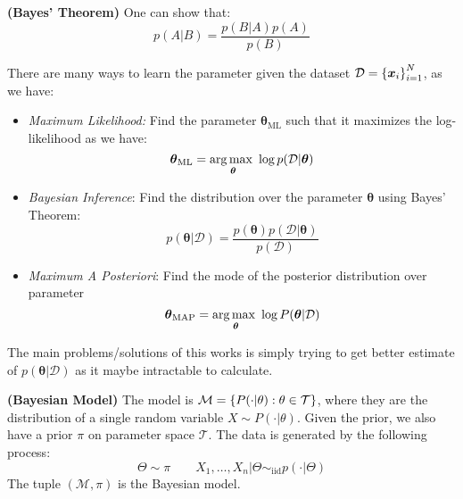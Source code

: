 \begin{theorem}{\textbf{(Bayes' Theorem)}}
    One can show that:
    \begin{equation*}
        p(A|B) = \frac{p(B|A)p(A)}{p(B)}
    \end{equation*}
\end{theorem}

\begin{remark}
    There are many ways to learn the parameter given the dataset $\mathcal{D} = \left\{ \boldsymbol x_i \right\}^N_{i=1}$, as we have:
    \begin{itemize}
        \item \emph{Maximum Likelihood:} Find the parameter $\boldsymbol \theta_\text{ML}$ such that it maximizes the log-likelihood as we have:
        \begin{equation*}
            \boldsymbol \theta_\text{ML} = \underset{\boldsymbol \theta}{\arg\max \ } \log p(\mathcal{D} | \boldsymbol \theta)
        \end{equation*}
        \item \emph{Bayesian Inference}: Find the distribution over the parameter $\boldsymbol \theta$ using Bayes' Theorem:
        \begin{equation*}
            p(\boldsymbol \theta | \mathcal{D}) = \frac{p(\boldsymbol \theta)p(\mathcal{D}|\boldsymbol \theta)}{p(\mathcal{D})}
        \end{equation*}
        \item \emph{Maximum A Posteriori}: Find the mode of the posterior distribution over parameter
        \begin{equation*}
            \boldsymbol \theta_\text{MAP} = \underset{\boldsymbol \theta}{\arg\max \ } \log P(\boldsymbol \theta | \mathcal{D})
        \end{equation*}
    \end{itemize}
    The main problems/solutions of this works is simply trying to get better estimate of $p(\boldsymbol \theta|\mathcal{D})$ as it maybe intractable to calculate. 
\end{remark}

\begin{definition}{\textbf{(Bayesian Model)}}
    The model is $\mathcal{M} = \left\{ P(\cdot|\theta) : \theta \in \mathcal{T} \right\}$, where they are the distribution of a single random variable $X \sim P(\cdot|\theta)$. Given the prior, we also have a prior $\pi$ on parameter space $\mathcal{T}$. The data is generated by the following process:
    \begin{equation*}
        \Theta \sim \pi \qquad X_1,\dots,X_n | \Theta \sim_\text{iid} p(\cdot|\Theta)
    \end{equation*}
    The tuple $(\mathcal{M}, \pi)$ is the Bayesian model.
\end{definition}

